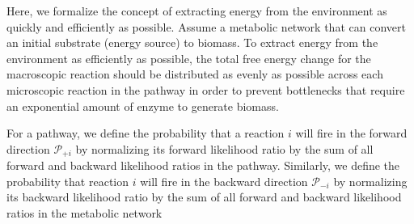 Here, we formalize the concept of extracting energy from the environment as quickly and efficiently as possible. Assume a metabolic network that can convert an initial substrate (energy source) to biomass. To extract energy from the environment as efficiently as possible, the total free energy change for the macroscopic reaction should be distributed as evenly as possible across each microscopic reaction in the pathway in order to prevent bottlenecks that require an exponential amount of enzyme to generate biomass.


For a pathway, we define the probability that a reaction $i$ will fire in the forward  direction ${\mathcal P_{+i}}$ by normalizing its forward likelihood ratio by the sum of all forward and backward likelihood ratios in the pathway. Similarly, we define the probability that reaction $i$ will fire in the backward direction $\mathcal P_{-i}$ by normalizing its backward likelihood ratio by  the sum of all forward and backward likelihood ratios in the metabolic network